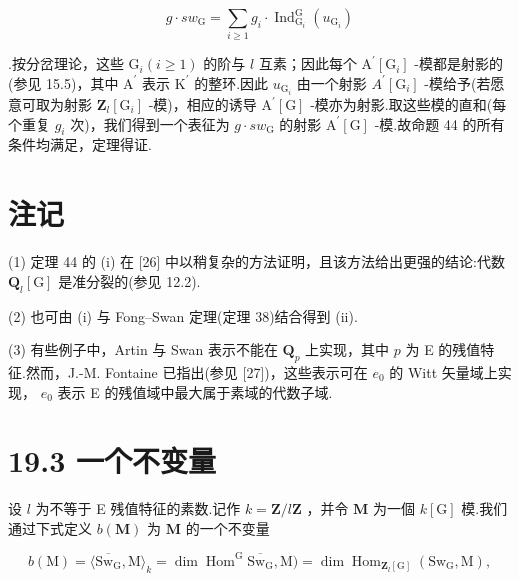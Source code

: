 \documentclass[10pt]{article}
\begin{document}
\[
g \cdot  s{w}_{\mathrm{G}} = \mathop{\sum }\limits_{{i \geq  1}}{g}_{i} \cdot  {\operatorname{Ind}}_{{\mathrm{G}}_{i}}^{\mathrm{G}}\left( {u}_{{\mathrm{G}}_{i}}\right)
\]

.按分岔理论，这些 \({\mathrm{G}}_{i}\left( {i \geq  1}\right)\) 的阶与 \(l\) 互素；因此每个 \({\mathrm{A}}^{\prime }\left\lbrack  {\mathrm{G}}_{i}\right\rbrack\) -模都是射影的(参见 15.5)，其中 \({\mathrm{A}}^{\prime }\) 表示 \({\mathrm{K}}^{\prime }\) 的整环.因此 \({u}_{{\mathrm{G}}_{i}}\) 由一个射影 \({A}^{\prime }\left\lbrack  {\mathrm{G}}_{i}\right\rbrack\) -模给予(若愿意可取为射影 \({\mathbf{Z}}_{l}\left\lbrack  {\mathrm{G}}_{i}\right\rbrack\) -模)，相应的诱导 \({\mathrm{A}}^{\prime }\left\lbrack  \mathrm{G}\right\rbrack\) -模亦为射影.取这些模的直和(每个重复 \({g}_{i}\) 次)，我们得到一个表征为 \(g \cdot  s{w}_{\mathrm{G}}\) 的射影 \({\mathrm{A}}^{\prime }\left\lbrack  \mathrm{G}\right\rbrack\) -模.故命题 44 的所有条件均满足，定理得证.

\section*{注记}

(1) 定理 44 的 (i) 在 [26] 中以稍复杂的方法证明，且该方法给出更强的结论:代数 \({\mathbf{Q}}_{l}\left\lbrack  \mathrm{G}\right\rbrack\) 是准分裂的(参见 12.2).

(2) 也可由 (i) 与 Fong–Swan 定理(定理 38)结合得到 (ii).

(3) 有些例子中，Artin 与 Swan 表示不能在 \({\mathbf{Q}}_{p}\) 上实现，其中 \(p\) 为 E 的残值特征.然而，J.-M. Fontaine 已指出(参见 [27])，这些表示可在 \({e}_{0}\) 的 Witt 矢量域上实现， \({e}_{0}\) 表示 E 的残值域中最大属于素域的代数子域.

\section*{19.3 一个不变量}

设 \(l\) 为不等于 E 残值特征的素数.记作 \(k = \mathbf{Z}/l\mathbf{Z}\) ，并令 \(\mathbf{M}\) 为一個 \(k\left\lbrack  \mathrm{G}\right\rbrack\) 模.我们通过下式定义 \(b\left( \mathbf{M}\right)\) 为 \(\mathbf{M}\) 的一个不变量

\[
b\left( \mathrm{M}\right)  = \langle \overline{{\mathrm{{Sw}}}_{\mathrm{G}}},\mathrm{M}{\rangle }_{k} = \dim {\operatorname{Hom}}^{\mathrm{G}}\overline{{\mathrm{{Sw}}}_{\mathrm{G}}},\mathrm{M}) = \dim {\operatorname{Hom}}_{{\mathbf{Z}}_{l}\left\lbrack  \mathrm{G}\right\rbrack  }\left( {{\mathrm{{Sw}}}_{\mathrm{G}},\mathrm{M}}\right) ,
\]
\end{document}
